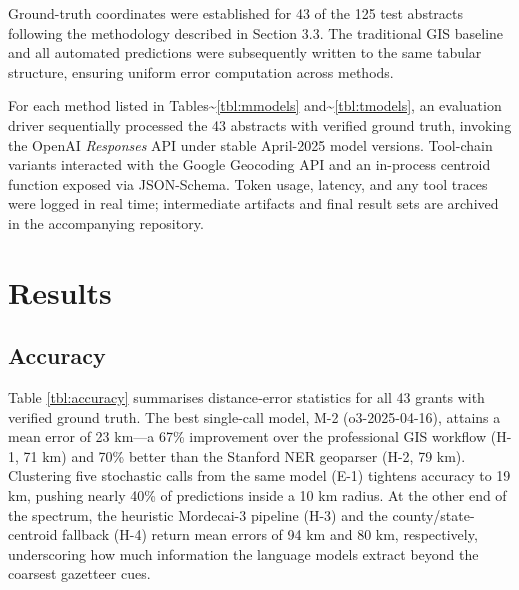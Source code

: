 Ground-truth coordinates were established for 43 of the 125 test
abstracts following the methodology described in Section 3.3. The
traditional GIS baseline and all automated predictions were subsequently
written to the same tabular structure, ensuring uniform error
computation across methods.

For each method listed in Tables\textasciitilde{}\ref{tbl:mmodels}
and\textasciitilde{}\ref{tbl:tmodels}, an evaluation driver sequentially
processed the 43 abstracts with verified ground truth, invoking the
OpenAI \emph{Responses} API under stable April-2025 model versions.
Tool-chain variants interacted with the Google Geocoding API and an
in-process centroid function exposed via JSON-Schema. Token usage,
latency, and any tool traces were logged in real time; intermediate
artifacts and final result sets are archived in the accompanying
repository.

\section{Results}\label{results}

\subsection{Accuracy}\label{accuracy}

Table \ref{tbl:accuracy} summarises distance‐error statistics for all 43
grants with verified ground truth. The best single-call model, M-2
(o3-2025-04-16), attains a mean error of 23 km---a 67\% improvement over
the professional GIS workflow (H-1, 71 km) and 70\% better than the
Stanford NER geoparser (H-2, 79 km). Clustering five stochastic calls
from the same model (E-1) tightens accuracy to 19 km, pushing nearly
40\% of predictions inside a 10 km radius. At the other end of the
spectrum, the heuristic Mordecai-3 pipeline (H-3) and the
county/state-centroid fallback (H-4) return mean errors of 94 km and 80
km, respectively, underscoring how much information the language models
extract beyond the coarsest gazetteer cues.

